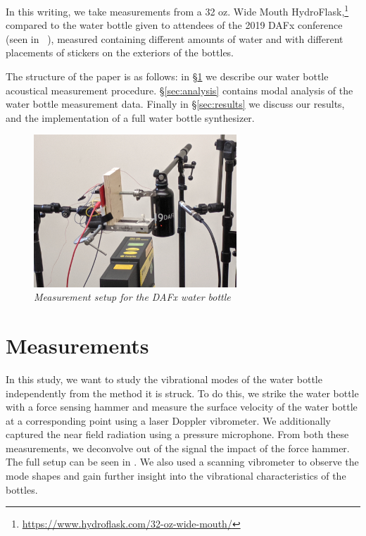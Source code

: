 \documentclass[twoside,a4paper]{article}
\begin{document}

In this writing, we take measurements from a 32 oz. Wide Mouth
HydroFlask,\footnote{\url{https://www.hydroflask.com/32-oz-wide-mouth/}}
compared to the water bottle given to attendees of the 2019 DAFx
conference (seen in ~), measured containing different amounts of water and with different placements of stickers on the exteriors of the
bottles.

The structure of the paper is as follows: in \S\ref{sec:measure} we describe
our water bottle acoustical measurement procedure. \S\ref{sec:analysis}
contains modal analysis of the water bottle measurement data.
Finally in \S\ref{sec:results} we discuss our results, and the
implementation of a full water bottle synthesizer.


\begin{figure}[!t]
    \centering
    \includegraphics[width=3in]{Figures/dafx_measure}
    \caption{\it{Measurement setup for the DAFx water bottle}}
    \label{fig:dafx_measure}
\end{figure}

\section{Measurements} \label{sec:measure}
%
In this study, we want to study the vibrational modes of the water bottle independently from the method it is struck. To do this, we strike the water bottle with a force sensing hammer and measure the surface velocity of the water bottle at a corresponding point using a laser Doppler vibrometer. We additionally captured the near field radiation using a pressure microphone. From both these measurements, we deconvolve out of the signal the impact of the force hammer. The full setup can be seen in . We also used a scanning vibrometer to observe the mode shapes and gain further insight into the vibrational characteristics of the bottles. 
\end{document}
